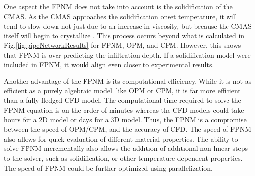 \documentclass{UCF_ETD}
\begin{document}
One aspect the FPNM does not take into account is the solidification of the CMAS. As the CMAS approaches the solidification onset temperature, it will tend to slow down not just due to an increase in viscosity, but because the CMAS itself will begin to crystallize \cite{Naraparaju2019}. This process occurs beyond what is calculated in Fig.\ref{fig:pipeNetworkResults} for FPNM, OPM, and CPM. However, this shows that FPNM is over-predicting the infiltration depth. If a solidification model were included in FPNM, it would align even closer to experimental results.

Another advantage of the FPNM is its computational efficiency. While it is not as efficient as a purely algebraic model, like OPM or CPM, it is far more efficient than a fully-fledged CFD model. The computational time required to solve the FPNM equation is on the order of minutes whereas the CFD models could take hours for a 2D model or days for a 3D model. Thus, the FPNM is a compromise between the speed of OPM/CPM, and the accuracy of CFD. The speed of FPNM also allows for quick evaluation of different material properties. The ability to solve FPNM incrementally also allows the addition of additional non-linear steps to the solver, such as solidification, or other temperature-dependent properties. The speed of FPNM could be further optimized using parallelization. 



\end{document}
